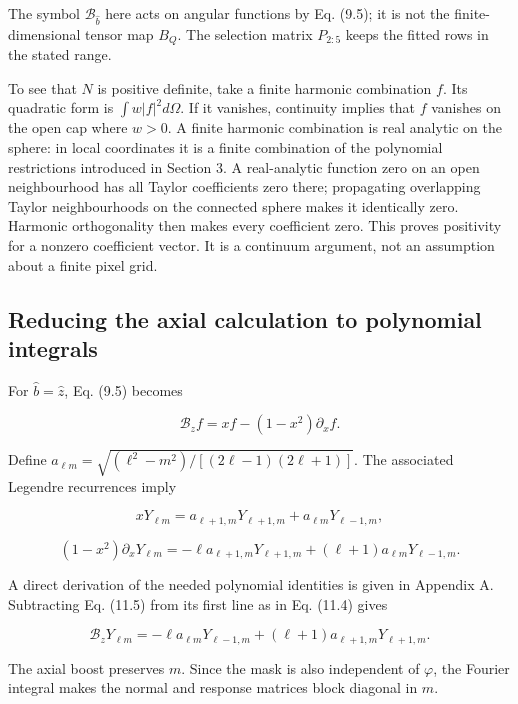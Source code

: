 \documentclass[
  11pt,
  a4paper]{article}
\begin{document}
The symbol \(\mathcal B_{\widehat b}\) here acts on angular functions by Eq. (9.5); it is not the finite-dimensional tensor map \(B_Q\). The selection matrix \(P_{2:5}\) keeps the fitted rows in the stated range.

To see that \(N\) is positive definite, take a finite harmonic combination \(f\). Its quadratic form is \(\int w|f|^2d\Omega\). If it vanishes, continuity implies that \(f\) vanishes on the open cap where \(w>0\). A finite harmonic combination is real analytic on the sphere: in local coordinates it is a finite combination of the polynomial restrictions introduced in Section 3. A real-analytic function zero on an open neighbourhood has all Taylor coefficients zero there; propagating overlapping Taylor neighbourhoods on the connected sphere makes it identically zero. Harmonic orthogonality then makes every coefficient zero. This proves positivity for a nonzero coefficient vector. It is a continuum argument, not an assumption about a finite pixel grid.

\hypertarget{reducing-the-axial-calculation-to-polynomial-integrals}{%
\subsection{Reducing the axial calculation to polynomial integrals}\label{reducing-the-axial-calculation-to-polynomial-integrals}}

For \(\widehat b=\widehat z\), Eq. (9.5) becomes

\[
\mathcal B_zf=xf-(1-x^2)\partial_xf.
\tag{11.4}
\]

Define
\(a_{\ell m}=\sqrt{(\ell^2-m^2)/[(2\ell-1)(2\ell+1)]}\).
The associated Legendre recurrences imply

\[
xY_{\ell m}=a_{\ell+1,m}Y_{\ell+1,m}+a_{\ell m}Y_{\ell-1,m},
\]

\[
(1-x^2)\partial_xY_{\ell m}
=-\ell a_{\ell+1,m}Y_{\ell+1,m}
+(\ell+1)a_{\ell m}Y_{\ell-1,m}.
\tag{11.5}
\]

A direct derivation of the needed polynomial identities is given in Appendix A. Subtracting Eq. (11.5) from its first line as in Eq. (11.4) gives

\[
\boxed{\mathcal B_zY_{\ell m}
=-\ell a_{\ell m}Y_{\ell-1,m}
+(\ell+1)a_{\ell+1,m}Y_{\ell+1,m}.}
\tag{11.6}
\]

The axial boost preserves \(m\). Since the mask is also independent of \(\varphi\), the Fourier integral makes the normal and response matrices block diagonal in \(m\).
\end{document}
